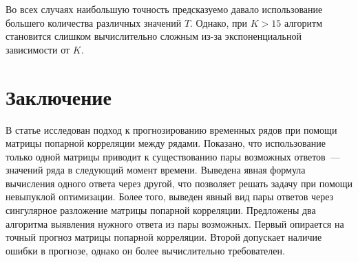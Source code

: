 \documentclass{article}
\begin{document}
Во всех случаях наибольшую точность предсказуемо давало использование большего количества различных значений $T$. Однако, при $K > 15$ алгоритм становится слишком вычислительно сложным из-за экспоненциальной зависимости от $K$.

\section{Заключение}

В статье исследован подход к прогнозированию временных рядов при помощи матрицы попарной корреляции между рядами. Показано, что использование только одной матрицы приводит к существованию пары возможных ответов~--- значений ряда в следующий момент времени. Выведена явная формула вычисления одного ответа через другой, что позволяет решать задачу при помощи невыпуклой оптимизации. Более того, выведен явный вид пары ответов через сингулярное разложение матрицы попарной корреляции. Предложены два алгоритма выявления нужного ответа из пары возможных. Первый опирается на точный прогноз матрицы попарной корреляции. Второй допускает наличие ошибки в прогнозе, однако он более вычислительно требователен.



\end{document}
